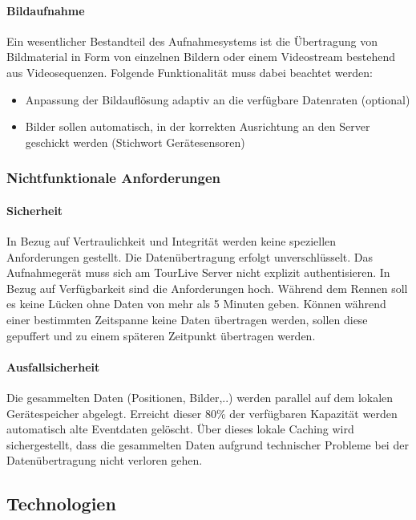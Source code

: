\paragraph{Bildaufnahme}
Ein wesentlicher Bestandteil des Aufnahmesystems ist die \"{U}bertragung von Bildmaterial in Form von einzelnen Bildern oder einem Videostream bestehend aus Videosequenzen. Folgende Funktionalit\"{a}t muss dabei beachtet werden:
\begin{itemize}
\item Anpassung der Bildaufl\"{o}sung adaptiv an die verf\"{u}gbare Datenraten (optional)
\item Bilder sollen automatisch, in der korrekten Ausrichtung an den Server geschickt werden (Stichwort Ger\"{a}tesensoren)
\end{itemize}


\subsubsection{Nichtfunktionale Anforderungen}

\paragraph{Sicherheit}
In Bezug auf Vertraulichkeit und Integrit\"{a}t werden keine speziellen Anforderungen gestellt. Die Daten\"{u}bertragung erfolgt unverschl\"{u}sselt. Das Aufnahmeger\"{a}t muss sich am TourLive Server nicht explizit authentisieren. In Bezug auf Verf\"{u}gbarkeit sind die Anforderungen hoch. W\"{a}hrend dem Rennen soll es keine L\"{u}cken ohne Daten von mehr als 5 Minuten geben. K\"{o}nnen w\"{a}hrend einer bestimmten Zeitspanne keine Daten \"{u}bertragen werden, sollen diese gepuffert und zu einem sp\"{a}teren Zeitpunkt \"{u}bertragen werden. 

\paragraph{Ausfallsicherheit}
Die gesammelten Daten (Positionen, Bilder,..) werden parallel auf dem lokalen Ger\"{a}tespeicher abgelegt. Erreicht dieser 80\% der verf\"{u}gbaren Kapazit\"{a}t werden automatisch alte Eventdaten gel\"{o}scht. Über dieses lokale Caching wird sichergestellt, dass die  gesammelten Daten aufgrund technischer Probleme bei der Daten\"{u}bertragung nicht verloren gehen. 

\subsection{Technologien}

